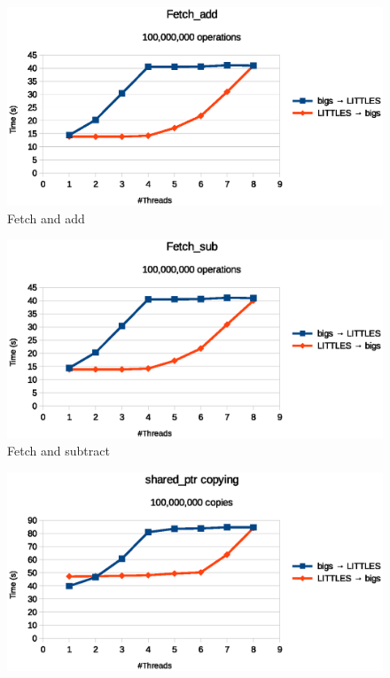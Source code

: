 \documentclass[11pt]{book}
\begin{document}
\begin{figure}
  \begin{minipage}{.5\textwidth}
    \begin{center}
      \includegraphics[width=\textwidth,keepaspectratio,quiet]{figs/big_little/fetchadd.eps} \\
      Fetch and add \\
    \end{center}
  \end{minipage}%
  \hfill
  \begin{minipage}{.5\textwidth}
    \begin{center}
      \includegraphics[width=\textwidth,keepaspectratio,quiet]{figs/big_little/fetchsub.eps} \\
      Fetch and subtract \\
    \end{center}
  \end{minipage}
  \centering
  \begin{minipage}{.5\textwidth}
    \begin{center}
      \includegraphics[width=\textwidth,keepaspectratio,quiet]{figs/big_little/sharedptr_copy.eps} \\

\end{center}
\end{minipage}
\end{figure}
\end{document}
